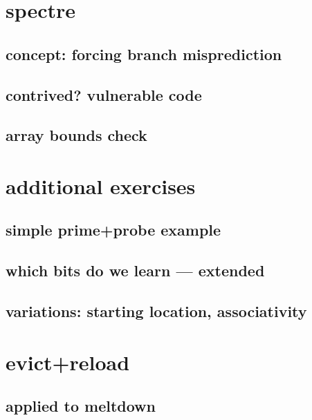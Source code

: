 \section{spectre}

\subsection{concept: forcing branch misprediction}


\subsection{contrived? vulnerable code}


\subsection{array bounds check}


\section{additional exercises}
\subsection{simple prime+probe example}


\subsection{which bits do we learn --- extended}

\subsection{variations: starting location, associativity}


\section{evict+reload}

\subsection{applied to meltdown}


